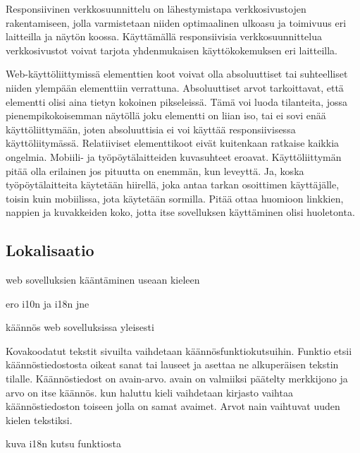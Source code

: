 \documentclass[11pt,a4paper,titlepage,oneside]{article}
\begin{document}
Responsiivinen verkkosuunnittelu on lähestymistapa verkkosivustojen rakentamiseen, jolla varmistetaan niiden optimaalinen ulkoasu ja toimivuus eri laitteilla ja näytön koossa.
Käyttämällä responsiivisia verkkosuunnittelua verkkosivustot voivat tarjota yhdenmukaisen käyttökokemuksen eri laitteilla.
\medskip


Web-käyttöliittymissä elementtien koot voivat olla absoluuttiset tai suhteelliset niiden ylempään elementtiin verrattuna. Absoluuttiset arvot tarkoittavat, että elementti olisi aina tietyn kokoinen pikseleissä. 
Tämä voi luoda tilanteita, jossa pienempikokoisemman näytöllä joku elementti on liian iso, tai ei sovi enää käyttöliittymään, joten absoluuttisia ei voi käyttää responsiivisessa käyttöliitymässä.
Relatiiviset elementtikoot eivät kuitenkaan ratkaise kaikkia ongelmia. Mobiili- ja työpöytälaitteiden kuvasuhteet eroavat. Käyttöliittymän pitää olla erilainen jos pituutta on enemmän, kun leveyttä. 
Ja, koska työpöytälaitteita käytetään hiirellä, joka antaa tarkan osoittimen käyttäjälle, toisin kuin mobiilissa, jota käytetään sormilla. 
Pitää ottaa huomioon linkkien, nappien ja kuvakkeiden koko, jotta itse sovelluksen käyttäminen olisi huoletonta.\medskip
\medskip






\subsection{Lokalisaatio}

web sovelluksien kääntäminen useaan kieleen

ero i10n ja i18n jne %
\medskip

käännös web sovelluksissa yleisesti

Kovakoodatut tekstit sivuilta vaihdetaan käännösfunktiokutsuihin.
Funktio etsii käännöstiedostosta oikeat sanat tai lauseet ja asettaa ne alkuperäisen tekstin tilalle. 
Käännöstiedost on avain-arvo. %
avain on valmiiksi päätelty merkkijono ja arvo on itse käännös. 
kun haluttu kieli vaihdetaan kirjasto vaihtaa käännöstiedoston toiseen jolla on samat avaimet. 
Arvot nain vaihtuvat uuden kielen tekstiksi.

\medskip

kuva i18n kutsu funktiosta
\end{document}
